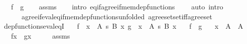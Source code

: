 \begin{isabellebody}
\ \ \ {\isachardoublequoteopen}f\ {\isacharequal}{\kern0pt}\ g{\isachardoublequoteclose}\isanewline
%
\isadelimproof
\ \ %
\endisadelimproof
%
\isatagproof
{}\isamarkupfalse%
\ assms\isanewline
\ \ \isamarkupfalse%
\ {\isacharparenleft}{\kern0pt}intro\ eq{\isacharunderscore}{\kern0pt}if{\isacharunderscore}{\kern0pt}agree{\isacharunderscore}{\kern0pt}if{\isacharunderscore}{\kern0pt}mem{\isacharunderscore}{\kern0pt}dep{\isacharunderscore}{\kern0pt}functions{\isacharparenright}{\kern0pt}\isanewline
\ \ \ \ {\isacharparenleft}{\kern0pt}auto\ intro{\isacharcolon}{\kern0pt}\isanewline
\ \ \ \ \ \ agree{\isacharunderscore}{\kern0pt}if{\isacharunderscore}{\kern0pt}eval{\isacharunderscore}{\kern0pt}eq{\isacharunderscore}{\kern0pt}if{\isacharunderscore}{\kern0pt}mem{\isacharunderscore}{\kern0pt}dep{\isacharunderscore}{\kern0pt}functions{\isacharbrackleft}{\kern0pt}unfolded\ agree{\isacharunderscore}{\kern0pt}set{\isacharunderscore}{\kern0pt}set{\isacharunderscore}{\kern0pt}iff{\isacharunderscore}{\kern0pt}agree{\isacharunderscore}{\kern0pt}set{\isacharbrackright}{\kern0pt}{\isacharparenright}{\kern0pt}%
\endisatagproof
{\isafoldproof}%
%
\isadelimproof
\isanewline
%
\endisadelimproof
\isanewline
{}\isamarkupfalse%
\ dep{\isacharunderscore}{\kern0pt}functions{\isacharunderscore}{\kern0pt}eval{\isacharunderscore}{\kern0pt}eqI{\isacharcolon}{\kern0pt}\isanewline
\ \ \ {\isachardoublequoteopen}f\ {\isasymin}\ {\isacharparenleft}{\kern0pt}x\ {\isasymin}\ A{\isacharparenright}{\kern0pt}\ {\isasymrightarrow}s\ {\isacharparenleft}{\kern0pt}B\ x{\isacharparenright}{\kern0pt}{\isachardoublequoteclose}\ {\isachardoublequoteopen}g\ {\isasymin}\ {\isacharparenleft}{\kern0pt}x\ {\isasymin}\ A{\isacharprime}{\kern0pt}{\isacharparenright}{\kern0pt}\ {\isasymrightarrow}s\ {\isacharparenleft}{\kern0pt}B{\isacharprime}{\kern0pt}\ x{\isacharparenright}{\kern0pt}{\isachardoublequoteclose}\isanewline
\ \ \ {\isachardoublequoteopen}f\ {\isasymsubseteq}\ g{\isachardoublequoteclose}\isanewline
\ \ \ {\isachardoublequoteopen}x\ {\isasymin}\ A\ {\isasyminter}\ A{\isacharprime}{\kern0pt}{\isachardoublequoteclose}\isanewline
\ \ \ {\isachardoublequoteopen}f{\isacharbackquote}{\kern0pt}x\ {\isacharequal}{\kern0pt}\ g{\isacharbackquote}{\kern0pt}x{\isachardoublequoteclose}\isanewline
%
\isadelimproof
%
\endisadelimproof
%
\isatagproof
{}\isamarkupfalse%
\ {\isacharminus}{\kern0pt}\isanewline
\ \ \isamarkupfalse%
\ assms\ \isamarkupfalse%

\end{isabellebody}
